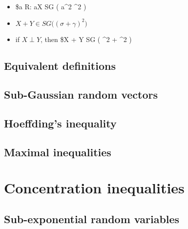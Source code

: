 \documentclass[
]{book}
\providecommand{\tightlist}{%
  \setlength{\itemsep}{0pt}\setlength{\parskip}{0pt}}
\begin{document}
{{{\begin{enumerate}
  \begin{itemize}
  \tightlist
  \item
    \$\forall a \in \mathbb R: aX \in SG \Big ( a\^{}2 \sigma\^{}2 \Big )
  \item
    \(X+Y \in SG \Big ( (\sigma + \gamma)^2\Big )\)
  \item
    if \(X \perp Y\), then \$X + Y \in SG \Big ( \sigma\^{}2 + \gamma\^{}2 \Big )
  \end{itemize}
\end{enumerate}

\hypertarget{equivalent-definitions}{%
\subsection{Equivalent definitions}\label{equivalent-definitions}}

\hypertarget{sub-gaussian-random-vectors}{%
\subsection{Sub-Gaussian random vectors}\label{sub-gaussian-random-vectors}}

\hypertarget{hoeffdings-inequality}{%
\subsection{Hoeffding's inequality}\label{hoeffdings-inequality}}

\hypertarget{section-1}{%
\subsection{}\label{section-1}}

\hypertarget{maximal-inequalities}{%
\subsection{Maximal inequalities}\label{maximal-inequalities}}

\hypertarget{concentration-inequalities-1}{%
\section{Concentration inequalities}\label{concentration-inequalities-1}}

\hypertarget{sub-exponential-random-variables}{%
\subsection{Sub-exponential random variables}\label{sub-exponential-random-variables}}

}}}
\end{document}
